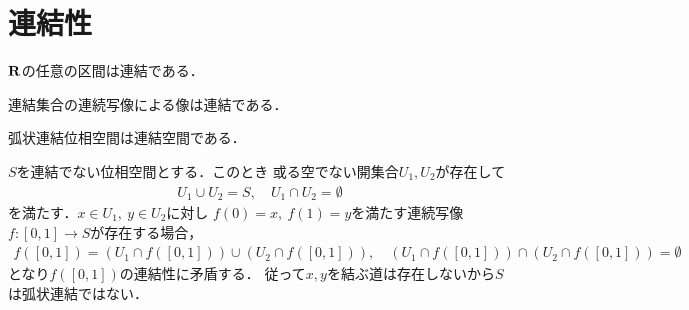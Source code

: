 \section{連結性}
	
	\begin{screen}
		\begin{thm}
			$\mathbf{R}$の任意の区間は連結である．
		\end{thm}
	\end{screen}
	
	\begin{screen}
		\begin{thm}
			連結集合の連続写像による像は連結である．
		\end{thm}
	\end{screen}
	
	\begin{screen}
		\begin{thm}[弧状連結なら連結]\label{thm:connected_path_connected}
			弧状連結位相空間は連結空間である．
		\end{thm}
	\end{screen}
	
	\begin{prf}
		$S$を連結でない位相空間とする．このとき
		或る空でない開集合$U_1,U_2$が存在して
		\begin{align}
			U_1 \cup U_2 = S,
			\quad U_1 \cap U_2 = \emptyset
		\end{align}
		を満たす．$x \in U_1,\ y \in U_2$に対し
		$f(0) = x,\ f(1) = y$を満たす連続写像
		$f:[0,1] \longrightarrow S$が存在する場合，
		\begin{align}
			f([0,1]) = \left( U_1 \cap f([0,1]) \right) \cup \left( U_2 \cap f([0,1]) \right),
			\quad \left( U_1 \cap f([0,1]) \right) \cap \left( U_2 \cap f([0,1]) \right) = \emptyset
		\end{align}
		となり$f([0,1])$の連結性に矛盾する．
		従って$x,y$を結ぶ道は存在しないから$S$は弧状連結ではない．
		\QED
	\end{prf}